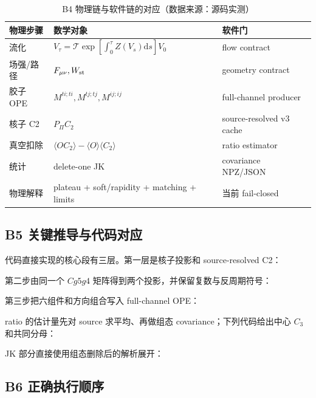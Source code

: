 \documentclass[UTF8]{ctexart}
\newcommand{\dd}{\mathrm{d}}
\begin{document}
\begin{table}[htbp]
\centering
\small
\caption{B4 物理链与软件链的对应（数据来源：源码实测）}
\begin{tabularx}{\textwidth}{@{}l X l@{}}
\toprule
物理步骤 & 数学对象 & 软件门 \\
\midrule
流化 & $V_\tau=\mathcal T\exp[\int_0^\tau Z(V_s)\dd s]V_0$ & flow contract \\
场强/路径 & $F_{\mu\nu},W_{\rm st}$ & geometry contract \\
胶子 OPE & $M^{ti;ti},M^{tj;tj},M^{ij;ij}$ & full-channel producer \\
核子 C2 & $P_\Pi C_{2}$ & source-resolved v3 cache \\
真空扣除 & $\langle OC_2\rangle-\langle O\rangle\langle C_2\rangle$ & ratio estimator \\
统计 & delete-one JK & covariance NPZ/JSON \\
物理解释 & plateau + soft/rapidity + matching + limits & 当前 fail-closed \\
\bottomrule
\end{tabularx}
\end{table}

\subsection{B5 关键推导与代码对应}

代码直接实现的核心段有三层。第一层是核子投影和 source-resolved C2：

第二步由同一个 \(Cg5g4\) 矩阵得到两个投影，并保留复数与反周期符号：

第三步把六组件和方向组合写入 full-channel OPE：


ratio 的估计量先对 source 求平均、再做组态 covariance；下列代码给出中心 \(C_3\)
和共同分母：

JK 部分直接使用组态删除后的解析展开：



\subsection{B6 正确执行顺序}
\end{document}
